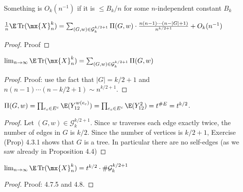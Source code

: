 \begin{def}
  \label{def:big_o_with_base}
  \notready
  Something is $O_k(n^{-1})$ if it is $\le B_k/n$ for some $n$-independent constant $B_k$
\end{def}

\begin{proposition}
  \label{prop:eqn_4_7}
  \notready
  $\frac1n\E\Tr(\mx{X}_n^k) = \sum_{(G,w)\in\mathcal{G}^{k/2+1}_k} \Pi(G,w) \cdot \frac{n(n-1)\cdots(n-|G|+1)}{n^{k/2+1}} + O_k(n^{-1})$
\end{proposition}

\begin{proof}
  \notready
  Proof
\end{proof}




\begin{proposition}
  \label{prop:4_7_5}
  \notready
  $\lim_{n\to\infty}\E\Tr(\mx{X}_n^k) = \sum_{(G,w)\in\mathcal{G}^{k/2+1}_k} \Pi(G,w)$
\end{proposition}

\begin{proof}
  \notready
  Proof: use the fact that $|G|=k/2+1$ and $n(n-1)\cdots(n-k/2+1) \sim n^{k/2+1}$.
\end{proof}




\begin{proposition}
  \label{prop:eqn_4_8}
  \notready
  $\Pi(G,w) = \prod_{e_c\in E^c} \E(Y_{12}^{w(e_c)}) = \prod_{e_c\in E^c} \E(Y_{12}^2) = t^{\#E} = t^{k/2}$.
\end{proposition}

\begin{proof}
  \notready
  Let $(G,w)\in\mathcal{G}^{k/2+1}_k$.  Since $w$ traverses each edge exactly twice, the number of edges in $G$ is $k/2$.  Since the number of vertices is $k/2+1$, Exercise (Prop) 4.3.1 shows that $G$ is a tree.  In particular there are no self-edges (as we saw already in Proposition 4.4)
\end{proof}




\begin{proposition}%
  \label{}
  \notready
  $\lim_{n\to\infty} \E\Tr(\mx{X}_n^k) = t^{k/2}\cdot\#\mathcal{G}_k^{k/2+1}$
\end{proposition}

\begin{proof}
  \notready
  Proof: 4.7.5 and 4.8.
\end{proof}
